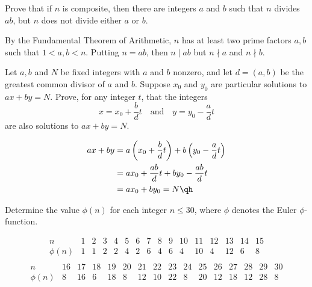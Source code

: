\begin{exercise}\label{ex0.2.3}
    Prove that if $n$ is composite, then there are integers $a$ and $b$ such that $n$ divides $ab$, but $n$ does not divide either $a$ or $b$.
\end{exercise}

\begin{sol}
    By the Fundamental Theorem of Arithmetic, $n$ has at least two prime factors $a, b$ such that $1 < a, b < n$. Putting $n = ab$, then $n \mid ab$ but $n \nmid a$ and $n \nmid b$.
\end{sol}

\begin{exercise}\label{ex0.2.4}
    Let $a, b$ and $N$ be fixed integers with $a$ and $b$ nonzero, and let $d = (a, b)$ be the greatest common divisor of $a$ and $b$. Suppose $x_0$ and $y_0$ are particular solutions to $ax + by = N$. Prove, for any integer $t$, that the integers
    \[x = x_0 + \frac bdt \quad \text{and} \quad y = y_0 - \frac adt\]
    are also solutions to $ax + by = N$.

\end{exercise}

\begin{sol}
    \begin{align*}
        ax + by & = a\left(x_0 + \frac bdt\right) + b\left(y_0 - \frac adt\right) \\
        & = ax_0 + \frac{ab}{d}t + by_0 - \frac{ab}{d}t \\
        & = ax_0 + by_0 = N \qh
    \end{align*}
\end{sol}

\begin{exercise}\label{ex0.2.5}
    Determine the value $\phi(n)$ for each integer $n \leq 30$, where $\phi$ denotes the Euler $\phi$-function.
\end{exercise}

\begin{sol}
    \[\begin{array}{c|c|c|c|c|c|c|c|c|c|c|c|c|c|c|c}
        n & 1 & 2 & 3 & 4 & 5 & 6 & 7 & 8 & 9 & 10 & 11 & 12 & 13 & 14 & 15 \\
        \hline
        \phi(n) & 1 & 1 & 2 & 2 & 4 & 2 & 6 & 4 & 6 & 4 & 10 & 4 & 12 & 6 & 8 \\
    \end{array}\]
    \[\begin{array}{c|c|c|c|c|c|c|c|c|c|c|c|c|c|c|c}
        n & 16 & 17 & 18 & 19 & 20 & 21 & 22 & 23 & 24 & 25 & 26 & 27 & 28 & 29 & 30 \\
        \hline
        \phi(n) & 8 & 16 & 6 & 18 & 8 & 12 & 10 & 22 & 8 & 20 & 12 & 18 & 12 & 28 & 8 \\
    \end{array}\]
\end{sol}

